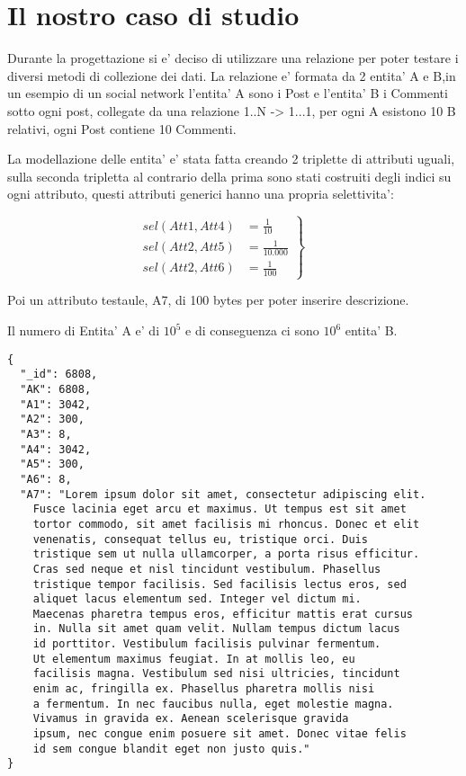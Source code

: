 \section{Il nostro caso di studio}

Durante la progettazione si e' deciso di utilizzare una relazione per poter testare i diversi metodi di collezione dei dati.
La relazione e' formata da 2 entita' A e B,in un esempio di un social network l'entita' A sono i Post e l'entita' B i Commenti sotto ogni post, collegate da una relazione 1..N -> 1...1,
per ogni A esistono 10 B relativi, ogni Post contiene 10 Commenti.

La modellazione delle entita' e' stata fatta creando 2 triplette di attributi uguali, sulla seconda tripletta al contrario della prima sono stati costruiti degli indici su ogni attributo,
questi attributi generici hanno una propria selettivita':

    \begin{equation*}
        \left.\begin{aligned}
         sel(Att1, Att4) &= \frac{1}{10}    \\
         sel(Att2, Att5) &= \frac{1}{10.000} \\
         sel(Att2, Att6) &= \frac{1}{100}
        \end{aligned}
        \right\}
        \qquad 
        \end{equation*}

Poi un attributo testaule, A7, di 100 bytes per poter inserire descrizione.

Il numero di Entita' A e' di $10^5$ e di conseguenza ci sono $10^6$ entita' B.

\begin{Verbatim}[frame=single,framesep=2mm,label=A (POST),labelposition=all]
{
  "_id": 6808,
  "AK": 6808,
  "A1": 3042,
  "A2": 300,
  "A3": 8,
  "A4": 3042,
  "A5": 300,
  "A6": 8,
  "A7": "Lorem ipsum dolor sit amet, consectetur adipiscing elit. 
    Fusce lacinia eget arcu et maximus. Ut tempus est sit amet 
    tortor commodo, sit amet facilisis mi rhoncus. Donec et elit
    venenatis, consequat tellus eu, tristique orci. Duis 
    tristique sem ut nulla ullamcorper, a porta risus efficitur.
    Cras sed neque et nisl tincidunt vestibulum. Phasellus 
    tristique tempor facilisis. Sed facilisis lectus eros, sed 
    aliquet lacus elementum sed. Integer vel dictum mi. 
    Maecenas pharetra tempus eros, efficitur mattis erat cursus
    in. Nulla sit amet quam velit. Nullam tempus dictum lacus
    id porttitor. Vestibulum facilisis pulvinar fermentum.
    Ut elementum maximus feugiat. In at mollis leo, eu 
    facilisis magna. Vestibulum sed nisi ultricies, tincidunt
    enim ac, fringilla ex. Phasellus pharetra mollis nisi
    a fermentum. In nec faucibus nulla, eget molestie magna.
    Vivamus in gravida ex. Aenean scelerisque gravida 
    ipsum, nec congue enim posuere sit amet. Donec vitae felis
    id sem congue blandit eget non justo quis."
}
\end{Verbatim}

